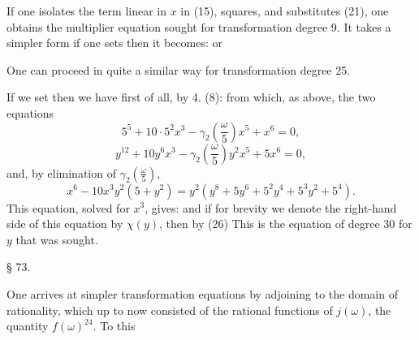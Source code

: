 If one isolates the term linear in $x$ in (15), squares, and substitutes
(21), one obtains the multiplier equation sought for transformation
degree 9. It takes a simpler form if one sets
then it becomes:
or

One can proceed in quite a similar way for transformation degree 25.

If we set
then we have first of all, by 4. (8):
from which, as above, the two equations
\[
5^5 + 10\cdot5^2x^3 - \gamma_2\left(\frac{\omega}{5}\right)x^5 + x^6 = 0,
\]
\[
y^{12} + 10y^6x^3 - \gamma_2\left(\frac{\omega}{5}\right)y^2x^5 + 5x^6 = 0,
\]
and, by elimination of $\gamma_2\left(\frac{\omega}{5}\right)$,
\[
x^6 - 10x^3y^2(5+y^2) = y^2(y^8 + 5y^6 + 5^2y^4 + 5^3y^2 + 5^4).
\]
This equation, solved for $x^3$, gives:
and if for brevity we denote the right-hand side of this equation by
$\chi(y)$, then by (26)
This is the equation of degree 30 for $y$ that was sought.

\begin{center}
§ 73.\quad {}
\end{center}

One arrives at simpler transformation equations by adjoining to the
domain of rationality, which up to now consisted of the rational
functions of $j(\omega)$, the quantity $f(\omega)^{24}$. To this
